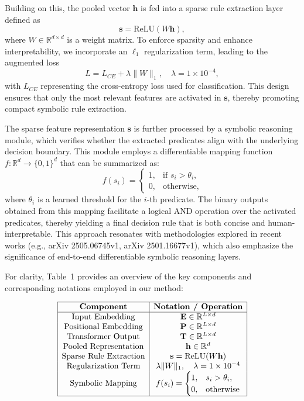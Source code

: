 \documentclass{article}
\begin{document}
Building on this, the pooled vector \( \mathbf{h} \) is fed into a sparse rule extraction layer defined as
\[
\mathbf{s} = \text{ReLU}(W \mathbf{h}),
\]
where \(W \in \mathbb{R}^{d \times d}\) is a weight matrix. To enforce sparsity and enhance interpretability, we incorporate an \(\ell_1\) regularization term, leading to the augmented loss
\[
L = L_{CE} + \lambda \|W\|_1, \quad \lambda = 1 \times 10^{-4},
\]
with \(L_{CE}\) representing the cross-entropy loss used for classification. This design ensures that only the most relevant features are activated in \(\mathbf{s}\), thereby promoting compact symbolic rule extraction.

The sparse feature representation \(\mathbf{s}\) is further processed by a symbolic reasoning module, which verifies whether the extracted predicates align with the underlying decision boundary. This module employs a differentiable mapping function \(f: \mathbb{R}^d \to \{0,1\}^d\) that can be summarized as:
\[
f(s_i) = \begin{cases}
1, & \text{if } s_i > \theta_i, \\
0, & \text{otherwise},
\end{cases}
\]
where \(\theta_i\) is a learned threshold for the \(i\)-th predicate. The binary outputs obtained from this mapping facilitate a logical AND operation over the activated predicates, thereby yielding a final decision rule that is both concise and human-interpretable. This approach resonates with methodologies explored in recent works (e.g., arXiv 2505.06745v1, arXiv 2501.16677v1), which also emphasize the significance of end-to-end differentiable symbolic reasoning layers.

For clarity, Table~1 provides an overview of the key components and corresponding notations employed in our method:

\[
\begin{array}{|c|c|}
\hline
\textbf{Component} & \textbf{Notation / Operation} \\
\hline
\text{Input Embedding} & \mathbf{E} \in \mathbb{R}^{L \times d} \\
\text{Positional Embedding} & \mathbf{P} \in \mathbb{R}^{L \times d} \\
\text{Transformer Output} & \mathbf{T} \in \mathbb{R}^{L \times d} \\
\text{Pooled Representation} & \mathbf{h} \in \mathbb{R}^{d} \\
\text{Sparse Rule Extraction} & \mathbf{s} = \text{ReLU}(W\mathbf{h}) \\
\text{Regularization Term} & \lambda \|W\|_1, \quad \lambda = 1 \times 10^{-4} \\
\text{Symbolic Mapping} & f(s_i) = \begin{cases}1, & s_i > \theta_i, \\ 0, & \text{otherwise}\end{cases} \\
\hline
\end{array}
\]
\end{document}
